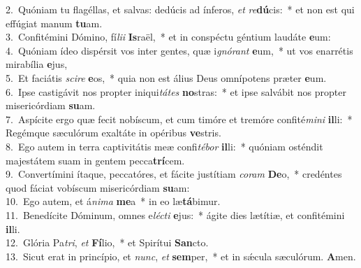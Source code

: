{2.~}Quóniam tu flagéllas, et salvas: dedúcis ad ínferos, \textit{et} \textit{re}\textbf{dú}cis:~* et non est qui effúgiat manum \textbf{tu}am.\\
{3.~}Confitémini Dómino, fí\textit{li}\textit{i} \textbf{Is}raël,~* et in conspéctu géntium laudáte \textbf{e}um:\\
{4.~}Quóniam ídeo dispérsit vos inter gentes, quæ i\textit{gnó}\textit{rant} \textbf{e}um,~* ut vos enarrétis mirabília \textbf{e}jus,\\
{5.~}Et faciátis \textit{sci}\textit{re} \textbf{e}os,~* quia non est álius Deus omnípotens præter \textbf{e}um.\\
{6.~}Ipse castigávit nos propter iniqui\textit{tá}\textit{tes} \textbf{no}stras:~* et ipse salvábit nos propter misericórdiam \textbf{su}am.\\
{7.~}Aspícite ergo quæ fecit nobíscum, et cum timóre et tremóre confité\textit{mi}\textit{ni} \textbf{il}li:~* Regémque sæculórum exaltáte in opéribus \textbf{ve}stris.\\
{8.~}Ego autem in terra captivitátis meæ confi\textit{té}\textit{bor} \textbf{il}li:~* quóniam osténdit majestátem suam in gentem pecca\textbf{trí}cem.\\
{9.~}Convertímini ítaque, peccatóres, et fácite justítiam \textit{co}\textit{ram} \textbf{De}o,~* credéntes quod fáciat vobíscum misericórdiam \textbf{su}am:\\
{10.~}Ego autem, et á\textit{ni}\textit{ma} \textbf{me}a~* in eo læ\textbf{tá}bimur.\\
{11.~}Benedícite Dóminum, omnes e\textit{lé}\textit{cti} \textbf{e}jus:~* ágite dies lætítiæ, et confitémini \textbf{il}li.\\
{12.~}Glória Pa\textit{tri}, \textit{et} \textbf{Fí}lio,~* et Spirítui \textbf{San}cto.\\
{13.~}Sicut erat in princípio, et \textit{nunc}, \textit{et} \textbf{sem}per,~* et in sǽcula sæculórum. \textbf{A}men.\\
